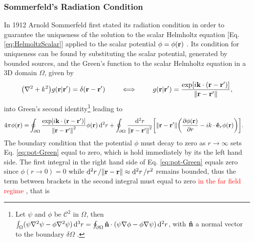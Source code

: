 


\subsubsection{Sommerfeld's Radiation Condition}

In 1912 Arnold Sommerfeld first stated its radiation condition in order to guarantee the uniqueness of the solution to the scalar Helmholtz equation [Eq. \eqref{eq:HelmoltzScalar}] applied to the scalar potential $\phi = \phi(\vb{r})$ \cite{schot_eighty_1992}. Its condition for uniqueness can be found by substituting the scalar potential, generated by bounded sources, and the Green's function to the scalar Helmholtz equation in a 3D domain $\Omega$, given by \cite{zangwill_modern_2013,jackson_classical_1999}
%
%
%
%
%
\begin{align}
    \qty(\nabla^2 + k^2) g(\vb{r}|\vb{r}')   = \delta(\vb{r}-\vb{r}')
        \qquad
        \iff
        \qquad
    g(\vb{r}|\vb{r}')   = \frac{\exp[i\vb{k}\cdot(\vb{r}-\vb{r}')]}{\norm{\vb{r}-\vb{r}'}},
\end{align}
%
into Green's second identity\footnote{%
        Let $\psi$ and $\phi$ be $\mathcal{C}^2$ in $\Omega$, then %
        $\int_\Omega (\psi\nabla^2\psi-\phi\nabla^2\psi)\dd[3]{r} = %
        \oint_{\partial\Omega}\vu{n}\cdot(\psi\nabla\phi-\phi\nabla\psi)\dd[2]{r}$, with $\vu{n}$ a normal vector to the boundary $\delta\Omega$  \cite{zangwill_modern_2013}.} %
 leading to
\begin{align}
    4\pi \phi(\vb{r}) =& \oint_{\partial\Omega}  \frac{\exp[i\vb{k}\cdot(\vb{r}-\vb{r}')]}{\norm{\vb{r}-\vb{r}'}^2} \phi(\vb{r}) \dd[2]{r}+
                 \oint_{\partial\Omega} \frac{\dd[2]{r}}{\norm{\vb{r}-\vb{r}'}^2} \qty[\norm{\vb{r}-\vb{r}'}\qty(\pdv{ \phi(\vb{r})}{r}-ik\cdot\vu{e}_r \phi(\vb{r})) ].
    \label{eq:pot-Green}
\end{align}
%
The boundary condition that the potential $\phi$ must decay to zero as $r\to\infty$ sets Eq. \eqref{eq:pot-Green} equal to zero, which is  hold immediately by its the left hand side. The first integral in the right hand side of Eq. \eqref{eq:pot-Green} equals zero since $\phi(r\to 0 ) = 0$ while $\dd[2]{r}/\norm{\vb{r}-\vb{r}}\approx\dd[2]{r}/r^2$ remains bounded, thus the term between brackets in the second integral must equal to zero \textcolor{red}{in the far field regime} \cite{schot_eighty_1992}, that is
